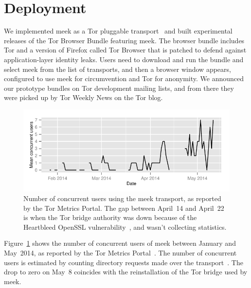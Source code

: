 \documentclass{article}
\begin{document}


\section{Deployment}
\label{sec:deployment}

We implemented meek as a Tor pluggable transport~\cite{pt}
and built experimental releases of the Tor Browser Bundle featuring meek.
The browser bundle includes Tor and a version of Firefox
called Tor Browser that is patched to defend against application-layer identity leaks.
Users need to download and run the bundle and select meek from the list of transports,
and then a browser window appears,
configured to use meek for circumvention and Tor for anonymity.
We announced our prototype bundles on Tor development mailing lists,
and from there they were picked up by Tor Weekly News on the Tor blog.

\begin{figure}
\includegraphics[width=\linewidth]{clients-meek}
\caption{Number of concurrent users using the meek transport,
as reported by the Tor Metrics Portal.
The gap between April~14 and April~22 is when the Tor bridge authority
was down because of the Heartbleed OpenSSL vulnerability~\cite{heartbleed}, and wasn't collecting statistics.}
\label{fig:clients}
\end{figure}

Figure~\ref{fig:clients} shows the number of concurrent users of meek between January and May~2014,
as reported by the Tor Metrics Portal~\cite{metrics-meek}.
The number of concurrent users is estimated by counting directory requests made over the transport~\cite{counting-daily-bridge-users}.
The drop to zero on May~8 coincides with the reinstallation of the Tor bridge used by meek.
\end{document}
